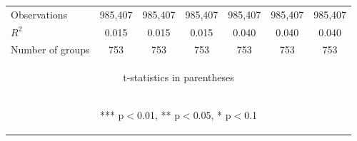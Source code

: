 \documentclass{standalone}
\begin{document}
\begin{tabular}{lcccccc}
    Observations     & 985,407                                         & 985,407                                         & 985,407                                         & 985,407                                        & 985,407                                        & 985,407                                        \\
    $R^2$            & 0.015                                           & 0.015                                           & 0.015                                           & 0.040                                          & 0.040                                          & 0.040                                          \\
    Number of groups & 753                                             & 753                                             & 753                                             & 753                                            & 753                                            & 753                                            \\ \hline
    \multicolumn{7}{c}{\begin{footnotesize} t-statistics in parentheses\end{footnotesize}}                                                                                                                                                                                                                                    \\
    \multicolumn{7}{c}{\begin{footnotesize} *** p$<$0.01, ** p$<$0.05, * p$<$0.1\end{footnotesize}}                                                                                                                                                                                                                           \\
\end{tabular}
\end{document}
